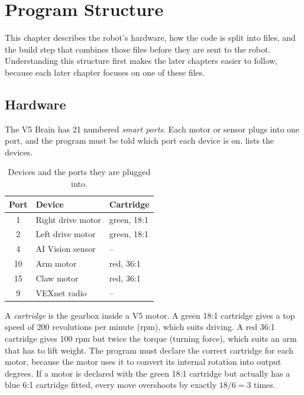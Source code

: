 \chapter{Program Structure}
\label{ch:structure}

This chapter describes the robot's hardware, how the code is split into files,
and the build step that combines those files before they are sent to the robot.
Understanding this structure first makes the later chapters easier to follow,
because each later chapter focuses on one of these files.

\section{Hardware}
\label{sec:hardware}

The V5 Brain has 21 numbered \emph{smart ports}. Each motor or sensor plugs into
one port, and the program must be told which port each device is on.
 lists the devices.

\begin{table}[h]
  \centering
  \begin{tabular}{@{}cll@{}}
    \toprule
    Port & Device & Cartridge \\
    \midrule
    1  & Right drive motor & green, 18:1 \\
    2  & Left drive motor  & green, 18:1 \\
    4  & AI Vision sensor  & -- \\
    10 & Arm motor         & red, 36:1 \\
    15 & Claw motor        & red, 36:1 \\
    9  & VEXnet radio      & -- \\
    \bottomrule
  \end{tabular}
  \caption{Devices and the ports they are plugged into.}
  \label{tab:ports}
\end{table}

A \emph{cartridge} is the gearbox inside a V5 motor. A green 18:1 cartridge
gives a top speed of 200 revolutions per minute (rpm), which suits driving. A
red 36:1 cartridge gives 100 rpm but twice the torque (turning force), which
suits an arm that has to lift weight. The program must declare the correct
cartridge for each motor, because the motor uses it to convert its internal
rotation into output degrees. If a motor is declared with the green 18:1
cartridge but actually has a blue 6:1 cartridge fitted, every move overshoots by
exactly $18/6 = 3$ times.

